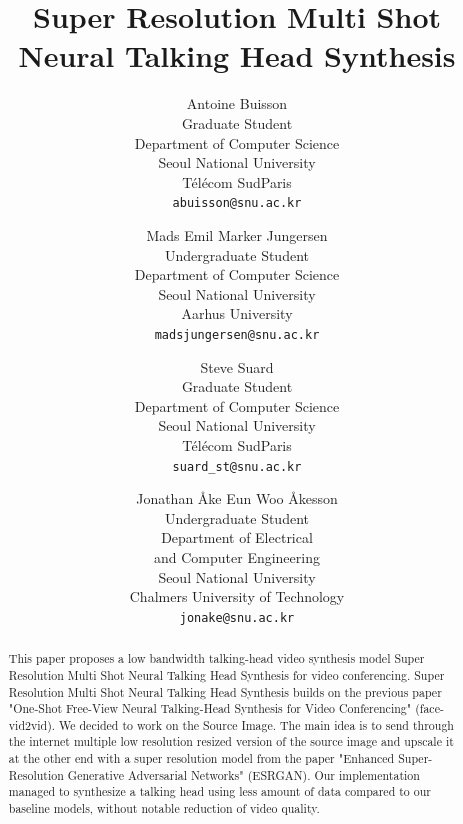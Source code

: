 \documentclass[10pt,twocolumn,letterpaper]{article}
\begin{document}
\title{Super Resolution Multi Shot Neural Talking Head Synthesis}
\author{Antoine Buisson\\
Graduate Student \\
Department of Computer Science\\
Seoul National University\\
Télécom SudParis\\
{\tt\small abuisson@snu.ac.kr}
\and
Mads Emil Marker Jungersen\\
Undergraduate Student\\
Department of Computer Science\\
Seoul National University\\
Aarhus University\\
{\tt\small madsjungersen@snu.ac.kr}
\and
Steve Suard\\
Graduate Student\\
Department of Computer Science\\
Seoul National University\\
Télécom SudParis\\
{\tt\small suard\_st@snu.ac.kr}
\and
Jonathan Åke Eun Woo Åkesson\\
Undergraduate Student\\
Department of Electrical \\
and Computer Engineering\\
Seoul National University\\
Chalmers University of Technology\\
    {\tt\small jonake@snu.ac.kr}
}

\maketitle

\begin{abstract}
   This paper proposes a low bandwidth talking-head video synthesis model Super Resolution Multi Shot Neural Talking Head Synthesis for video conferencing. Super Resolution Multi Shot Neural Talking Head Synthesis builds on the previous paper "One-Shot Free-View Neural Talking-Head Synthesis for Video Conferencing" (face-vid2vid). We decided to work on the Source Image. The main idea is to send through the internet multiple low resolution resized version of the source image and upscale it at the other end with a super resolution model from the paper "Enhanced Super-Resolution Generative Adversarial Networks" (ESRGAN). Our implementation managed to synthesize a talking head using less amount of data compared to our baseline models, without notable reduction of video quality. 
\end{abstract}
\end{document}
